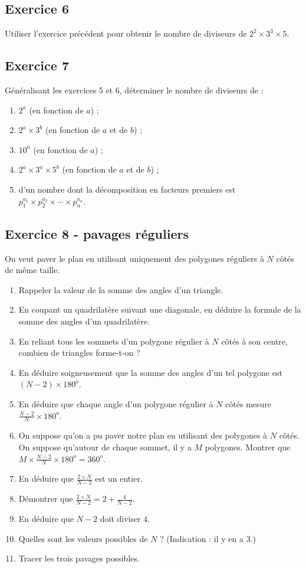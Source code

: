 \documentclass[12 pt]{article}
\theoremstyle{plain}
\newcounter{n}
\numberwithin{n}{section}
\begin{document}
\subsection*{Exercice 6}

Utiliser l'exercice précédent pour obtenir le nombre de diviseurs de $2^2\times 3^3\times 5$. 

\subsection*{Exercice 7}

Généralisant les exercices 5 et 6, déterminer le nombre de diviseurs de : \begin{enumerate}
\item $2^a$ (en fonction de $a$) ;
\item $2^a \times 3^b$ (en fonction de $a$ et de $b$) ;
\item $10^a$ (en fonction de $a$) ; 
\item $2^a\times 3^a\times 5^b$ (en fonction de $a$ et de $b$) ;
\item d'un nombre dont la décomposition en facteurs 
premiers est $p_1^{a_1}\times p_2^{a_2}\times\cdots\times p_n^{a_n}$. 
\end{enumerate}

\subsection*{Exercice 8 - pavages réguliers}

On veut paver le plan en utilisant uniquement des polygones réguliers à $N$ côtés de même taille. 

\begin{enumerate}
\item Rappeler la valeur de la somme des angles d'un triangle. 
\item En coupant un quadrilatère suivant une diagonale, en déduire la formule de la somme des angles d'un quadrilatère. 
\item En reliant tous les sommets d'un polygone régulier à $N$ côtés à son centre, combien de triangles forme-t-on ? 
\item En déduire soigneusement que la somme des angles d'un tel polygone est $(N-2)\times 180^o$. 
\item En déduire que chaque angle d'un polygone régulier à $N$ côtés mesure $\frac{N-2}N\times 180^o$.
\item On suppose qu'on a pu paver notre plan en utilisant des polygones à $N$ côtés. On suppose qu'autour de chaque sommet, il y a $M$ polygones. Montrer que $M\times \frac{N-2}N\times 180^o = 360^o$.
\item En déduire que $\frac{2\times N}{N-2}$ est un entier. 
\item Démontrer que $\frac{2\times N}{N-2} = 2 + \frac{4}{N-2}$. 
\item En déduire que $N-2$ doit diviser $4$. 
\item Quelles sont les valeurs possibles de $N$ ? (Indication : il y en a $3$.)
\item Tracer les trois pavages possibles. 
\end{enumerate}
\end{document}
